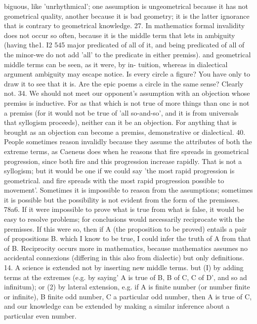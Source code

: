 {{{{{{{{{{{{biguous, like 'unrhythmical'; one assumption is ungeometrical
because it has not geometrical quality, another because it is
bad geometry; it is the latter ignorance that is contrary to
geometrical knowledge.
27. In mathematics formal invalidity does not occur so often,
because it is the middle term that lets in ambiguity (having the1. I2
545
major predicated of all of it, and being predicated of all of the
minor-we do not add 'all' to the predicate in either premiss).
and geometrical middle terms can be seen, as it were, by in-
tuition, whereas in dialectical argument ambiguity may escape
notice. Is every circle a figure? You have only to draw it to
see that it is. Are the epic poems a circle in the same sense?
Clearly not.
34. We should not meet our opponent's assumption with an
objection whose premiss is inductive. For as that which is not
true of more things than onc is not a premiss (for it would not be
true of 'all so-and-so', and it is from universals that syllogism
proceeds), neither can it be an objection. For anything that is
brought as an objection can become a premiss, demonstrative
or dialectical.
40. People sometimes reason invalidly because they assume
the attributes of both the extreme terms, as Caeneus does when
he reasons that fire spreads in geometrical progression, since both
fire and this progression increase rapidly. That is not a syllogism;
but it would be one if we could say 'the most rapid progression
is geometrical. and fire spreads with the most rapid progression
possible to movement'. Sometimes it is impossible to reason
from the assumptions; sometimes it is possible but the possibility
is not evident from the form of the premisses.
78a6. If it were impossible to prove what is true from what is
false, it would be easy to resolve problems; for conclusions would
necessarily reciprocate with the premisses. If this were so, then
if A (the proposition to be proved) entails a pair of propositions
B. which I know to be true, I could infer the truth of A from
that of B. Reciprocity occurs more in mathematics, because
mathematics assumes no accidental connexions (differing in this
also from dialectic) but only definitions.
14. A science is extended not by inserting new middle terms.
but (I) by adding terms at the extremes (e.g. by saying' A is
true of B, B of C, C of D', and so ad infinitum); or (2) by lateral
extension, e.g. if A is finite number (or number finite or infinite),
B finite odd number, C a particular odd number, then A is true
of C, and our knowledge can be extended by making a similar
inference about a particular even number.
}}}}}}}}}}}}
